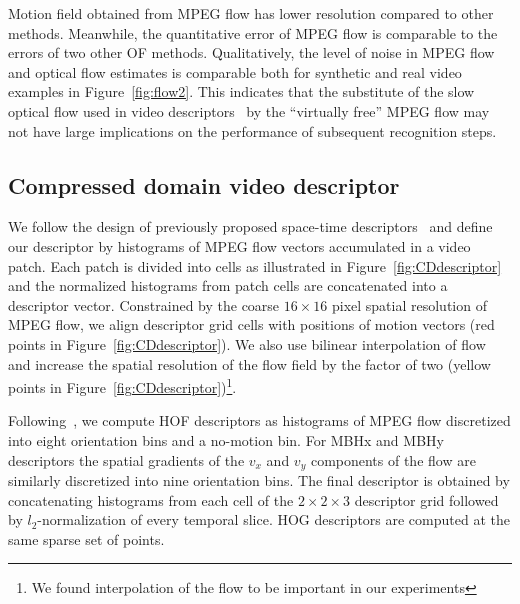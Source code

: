 \documentclass[10pt,twocolumn,letterpaper]{article}
\begin{document}
Motion field obtained from MPEG flow has lower resolution compared to other methods. 
Meanwhile, the quantitative error of MPEG flow is comparable to the errors of two other OF methods. Qualitatively, the level of noise in MPEG flow and optical flow estimates is comparable both for synthetic and real video examples in Figure~\ref{fig:flow2}. This indicates that the substitute of the slow optical flow used in video descriptors~\cite{Laptev08,Wang12} by the ``virtually free'' MPEG flow may not have large implications on the performance of subsequent recognition steps.





%
%




\subsection{Compressed domain video descriptor}
\label{sec:CDdescriptor}

We follow the design of previously proposed space-time descriptors~\cite{Laptev08,Wang12} and define our descriptor by histograms of MPEG flow vectors accumulated in a video patch. Each patch is divided into cells as illustrated in Figure~\ref{fig:CDdescriptor} and the normalized histograms from patch cells are concatenated into a descriptor vector. Constrained by the coarse $16\times16$ pixel spatial resolution of MPEG flow, we align descriptor grid cells with positions of motion vectors (red points in Figure~\ref{fig:CDdescriptor}). We also use bilinear interpolation of flow and increase the spatial resolution of the flow field by the factor of two (yellow points in Figure~\ref{fig:CDdescriptor})\footnote{We found interpolation of the flow to be important in our experiments}. 

Following~\cite{Wang12}, we compute HOF descriptors as histograms of MPEG flow discretized into eight orientation bins and a no-motion bin. For MBHx and MBHy descriptors the spatial gradients of the $v_x$ and $v_y$ components of the flow are similarly discretized into nine orientation bins. %
The final descriptor is obtained by concatenating histograms from each cell of the $2\times2\times3$ descriptor grid followed by $l_2$-normalization of every temporal slice. HOG descriptors are computed at the same sparse set of points.
\end{document}
